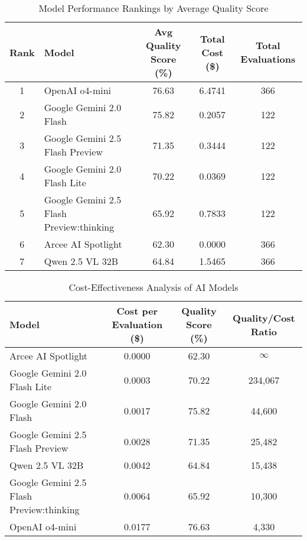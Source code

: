 \documentclass{article}
\begin{document}
\begin{table}[htbp]
\centering
\caption{Model Performance Rankings by Average Quality Score}
\label{tab:model_rankings}
\begin{tabular}{@{}clccc@{}}
\toprule
\textbf{Rank} & \textbf{Model} & \textbf{Avg Quality Score (\%)} & \textbf{Total Cost (\$)} & \textbf{Total Evaluations} \\
\midrule
1 & OpenAI o4-mini & 76.63 & 6.4741 & 366 \\
2 & Google Gemini 2.0 Flash & 75.82 & 0.2057 & 122 \\
3 & Google Gemini 2.5 Flash Preview & 71.35 & 0.3444 & 122 \\
4 & Google Gemini 2.0 Flash Lite & 70.22 & 0.0369 & 122 \\
5 & Google Gemini 2.5 Flash Preview:thinking & 65.92 & 0.7833 & 122 \\
6 & Arcee AI Spotlight & 62.30 & 0.0000 & 366 \\
7 & Qwen 2.5 VL 32B & 64.84 & 1.5465 & 366 \\
\bottomrule
\end{tabular}
\end{table}

\begin{table}[htbp]
\centering
\caption{Cost-Effectiveness Analysis of AI Models}
\label{tab:cost_effectiveness}
\begin{tabular}{@{}lccc@{}}
\toprule
\textbf{Model} & \textbf{Cost per Evaluation (\$)} & \textbf{Quality Score (\%)} & \textbf{Quality/Cost Ratio} \\
\midrule
Arcee AI Spotlight & 0.0000 & 62.30 & $\infty$ \\
Google Gemini 2.0 Flash Lite & 0.0003 & 70.22 & 234,067 \\
Google Gemini 2.0 Flash & 0.0017 & 75.82 & 44,600 \\
Google Gemini 2.5 Flash Preview & 0.0028 & 71.35 & 25,482 \\
Qwen 2.5 VL 32B & 0.0042 & 64.84 & 15,438 \\
Google Gemini 2.5 Flash Preview:thinking & 0.0064 & 65.92 & 10,300 \\
OpenAI o4-mini & 0.0177 & 76.63 & 4,330 \\
\bottomrule
\end{tabular}
\end{table}
\end{document}
